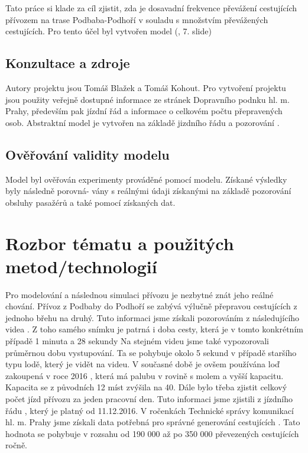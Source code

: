 \documentclass[11pt,a4paper]{article}
\begin{document}
    Tato práce si klade za cíl zjistit, zda je dosavadní frekvence převážení cestujících přívozem na trase Podbaba-Podhoří
    v souladu s množstvím převážených cestujících. Pro tento účel byl vytvořen model (\cite{SLAJD}, 7. slide)

		\subsection{Konzultace a zdroje}
			Autory projektu jsou Tomáš Blažek a Tomáš Kohout. Pro vytvoření projektu jsou použity veřejně dostupné informace ze stránek Dopravního podnku hl. m. Prahy, především pak jízdní řád a informace o celkovém počtu přepravených osob. Abstraktní model je vytvořen na základě jizdního řádu a pozorování .

		\subsection{Ověřování validity modelu}
    Model byl ověřován experimenty prováděné pomocí modelu. Získané výsledky byly následně porovná-
    vány s reálnými údaji získanými na základě pozorování obsluhy pasažérů \cite{DELKA_CESTY} a také pomocí získaných dat. \cite{ROCENKY}


	\section{Rozbor tématu a použitých metod/technologií}
  Pro modelování a následnou simulaci přívozu je nezbytné znát jeho reálné chování.
  Přívoz z Podbaby do Podhoří se zabývá výlučně přepravou cestujících z jednoho
  břehu na druhý. Tuto informaci jsme získali pozorováním z následujícího videa \cite{DELKA_CESTY}.
  Z toho samého snímku je patrná i doba cesty, která je v tomto konkrétním případě 1 minuta a 28 sekundy
  Na stejném videu jsme také vypozorovali průměrnou dobu vystupování. Ta se pohybuje
  okolo 5 sekund v případě staršího typu lodě, který je vidět na videu. V současné době je ovšem používána loď zakoupená
  v roce 2016 \cite{LOD}, která má palubu v rovině s molem a vyšší kapacitu. Kapacita se z původních 12 míst zvýšila na
  40. Dále bylo třeba zjistit celkový počet jízd přívozu za jeden pracovní den. Tuto informaci
  jsme zjistili z jízdního řádu \cite{PID}, který je platný od 11.12.2016.
  V ročenkách Technické správy komunikací hl. m. Prahy jsme získali data potřebná pro
  správné generování cestujících \cite{ROCENKY}. Tato hodnota se pohybuje v rozsahu od 190 000
  až po 350 000 převezených cestujících ročně.
\end{document}
